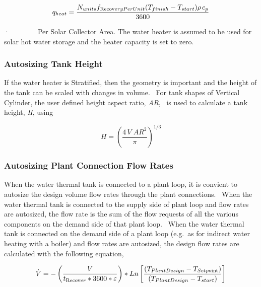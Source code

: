 \begin{equation}
{q_{heat}} = \frac{{{N_{units}}{f_{{\mathop{\rm Re}\nolimits} {\mathop{\rm cov}} eryPerUnit}}({T_{finish}} - {T_{start}})\rho \,{c_p}}}{{3600}}
\end{equation}

·~~~~~~~~Per Solar Collector Area. The water heater is assumed to be used for solar hot water storage and the heater capacity is set to zero.

\subsubsection{Autosizing Tank Height}\label{autosizing-tank-height}

If the water heater is Stratified, then the geometry is important and the height of the tank can be scaled with changes in volume.~ For tank shapes of Vertical Cylinder, the user defined height aspect ratio, \emph{AR},~ is used to calculate a tank height, \emph{H}, using

\begin{equation}
H = {\left( {\frac{{4\,V\;A{R^2}}}{\pi }} \right)^{1/3}}
\end{equation}

\subsubsection{Autosizing Plant Connection Flow Rates}\label{autosizing-plant-connection-flow-rates}

When the water thermal tank is connected to a plant loop, it is convient to autosize the design volume flow rates through the plant connections.~ When the water thermal tank is connected to the supply side of plant loop and flow rates are autosized, the flow rate is the sum of the flow requests of all the various components on the demand side of that plant loop.~ When the water thermal tank is connected on the demand side of a plant loop (e.g.~as for indirect water heating with a boiler) and flow rates are autosized, the design flow rates are calculated with the following equation,

\begin{equation}
\dot V =  - \left( {\frac{V}{{{t_{{\mathop{\rm Re}\nolimits} {\mathop{\rm cov}} er}} * 3600 * \varepsilon }}} \right) * Ln\left[ {\frac{{\left( {{T_{PlantDesign}} - {T_{Setpo{\mathop{\rm int}} }}} \right)}}{{\left( {{T_{PlantDesign}} - {T_{start}}} \right)}}} \right]
\end{equation}

